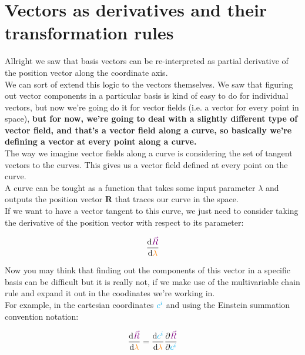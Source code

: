 \section{Vectors as derivatives and their transformation rules}

Allright we saw that basis vectors can be re-interpreted as partial derivative of the position
vector along the coordinate axis.\\
We can sort of extend this logic to the vectors themselves. We saw that figuring out vector 
components in a particular basis is kind of easy to do for individual vectors, but now we're going do it 
for vector fields (i.e. a vector for every point in space), \textbf{but for now, we're going to deal with a slightly 
different type of vector field, and that's a vector field along a curve, so basically we're defining 
a vector at every point along a curve.}\\

The way we imagine vector fields along a curve is considering the set of tangent vectors to the curves.
This gives us a vector field defined at every point on the curve.\\

A curve can be tought as a function that takes some input parameter $\lambda$ and outputs the position vector 
$\mathbf{R}$ that traces our curve in the space.\\
If we want to have a vector tangent to this curve, we just need to consider taking the derivative of the position 
vector with respect to its parameter:

\begin{equation}
    \frac{\dd \begingroup\color{violet}\vec{R}\endgroup}{\dd \begingroup\color{orange}\lambda\endgroup}
\end{equation}

Now you may think that finding out the components of this vector in a specific basis can be 
difficult but it is really not, if we make use of the multivariable chain rule and expand it out in the
coodinates we're working in.\\
For example, in the cartesian coordinates $\color{cyan}c^i$ and using the Einstein summation convention notation:

\begin{equation}
    \frac{\dd \begingroup\color{violet}\vec{R}\endgroup}{\dd \begingroup\color{orange}\lambda\endgroup} = 
    \frac{\dd \begingroup\color{cyan}c^i\endgroup}{\dd \begingroup\color{orange}\lambda\endgroup}
    \frac{\partial \begingroup\color{violet}\vec{R}\endgroup}{\partial \begingroup\color{cyan}c^i\endgroup}
\end{equation}

